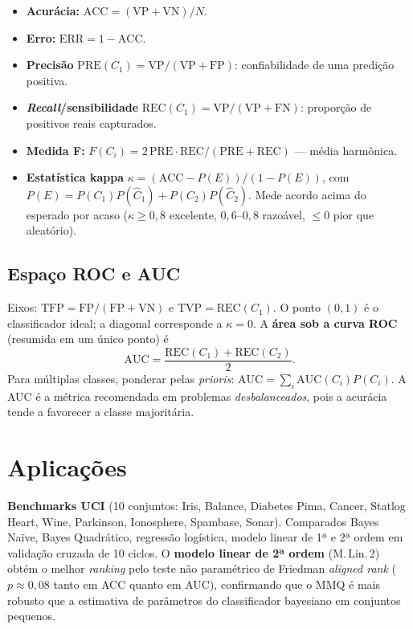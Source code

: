 \begin{itemize}[leftmargin=1.2cm]
  \item \textbf{Acurácia:} $\mathrm{ACC}=(\mathrm{VP}+\mathrm{VN})/N$.
  \item \textbf{Erro:} $\mathrm{ERR}=1-\mathrm{ACC}$.
  \item \textbf{Precisão} $\mathrm{PRE}(C_1)=\mathrm{VP}/(\mathrm{VP}+\mathrm{FP})$:
        confiabilidade de uma predição positiva.
  \item \textbf{\emph{Recall}/sensibilidade}
        $\mathrm{REC}(C_1)=\mathrm{VP}/(\mathrm{VP}+\mathrm{FN})$:
        proporção de positivos reais capturados.
  \item \textbf{Medida F:}
        $F(C_i)=2\,\mathrm{PRE}\cdot\mathrm{REC}/(\mathrm{PRE}+\mathrm{REC})$
        --- média harmônica.
  \item \textbf{Estatística kappa}
        $\kappa=(\mathrm{ACC}-P(E))/(1-P(E))$, com
        $P(E)=P(C_1)P(\hat C_1)+P(C_2)P(\hat C_2)$. Mede acordo acima
        do esperado por acaso ($\kappa\geq 0{,}8$ excelente,
        $0{,}6$--$0{,}8$ razoável, $\leq 0$ pior que aleatório).
\end{itemize}

\subsection{Espaço ROC e AUC}

Eixos: $\mathrm{TFP}=\mathrm{FP}/(\mathrm{FP}+\mathrm{VN})$ e
$\mathrm{TVP}=\mathrm{REC}(C_1)$. O ponto $(0,1)$ é o classificador
ideal; a diagonal corresponde a $\kappa=0$. A
\textbf{área sob a curva ROC} (resumida em um único ponto) é
\[
\mathrm{AUC}=\frac{\mathrm{REC}(C_1)+\mathrm{REC}(C_2)}{2}.
\]
Para múltiplas classes, ponderar pelas \emph{prioris}:
$\mathrm{AUC}=\sum_i \mathrm{AUC}(C_i)P(C_i)$. A AUC é a métrica
recomendada em problemas \emph{desbalanceados}, pois a acurácia tende
a favorecer a classe majoritária.

\section{Aplicações}

\begin{aplicacao}
\textbf{Benchmarks UCI} (10 conjuntos: Iris, Balance, Diabetes Pima,
Cancer, Statlog Heart, Wine, Parkinson, Ionosphere, Spambase, Sonar).
Comparados Bayes Naïve, Bayes Quadrático, regressão logística, modelo
linear de 1ª e 2ª ordem em validação cruzada de 10 ciclos.
O \textbf{modelo linear de 2ª ordem} (M.\,Lin.\,2) obtém o melhor
\emph{ranking} pelo teste não paramétrico de Friedman \emph{aligned
rank} ($p\approx 0{,}08$ tanto em ACC quanto em AUC), confirmando que
o MMQ é mais robusto que a estimativa de parâmetros do classificador
bayesiano em conjuntos pequenos.
\end{aplicacao}

